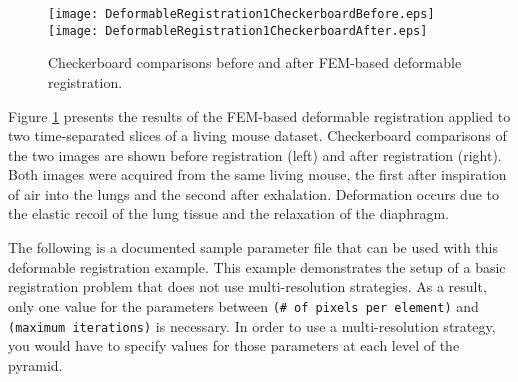 %
%
%
%
%
%

 
\begin{figure} \center
\texttt{[image: DeformableRegistration1CheckerboardBefore.eps]}
\texttt{[image: DeformableRegistration1CheckerboardAfter.eps]}
\caption{Checkerboard comparisons before and after FEM-based deformable registration.}
\label{fig:DeformableRegistration1Output}
\end{figure}

\ifitkFullVersion

\fi

Figure \ref{fig:DeformableRegistration1Output} presents the results of
the FEM-based deformable registration applied to two time-separated
slices of a living mouse dataset.  Checkerboard comparisons of the two
images are shown before registration (left) and after registration
(right).  Both images were acquired from the same living mouse, the
first after inspiration of air into the lungs and the second after
exhalation.  Deformation occurs due to the elastic recoil of the lung
tissue and the relaxation of the diaphragm.

The following is a documented sample parameter file that can be used with this
deformable registration example.  This example demonstrates the setup of a
basic registration problem that does not use multi-resolution strategies.  As a
result, only one value for the parameters between \texttt{(\# of pixels per
element)} and \texttt{(maximum iterations)} is necessary.  In order to use a
multi-resolution strategy, you would have to specify values for those
parameters at each level of the pyramid.




